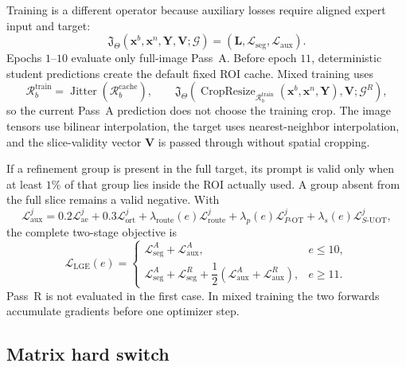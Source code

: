 \documentclass[10pt]{article}
\newcommand{\cL}{\mathcal{L}}
\newcommand{\cG}{\mathcal{G}}
\newcommand{\Crop}{\operatorname{CropResize}}
\begin{document}
Training is a different operator because auxiliary losses require aligned
expert input and target:
\[
 \mathfrak J_\Theta(\bm x^b,\bm x^n,\bm Y,\bm V;\cG)
 =(\bm L,\cL_{\mathrm{seg}},\cL_{\mathrm{aux}}).
\]
Epochs $1$--$10$ evaluate only full-image Pass~A.  Before epoch $11$,
deterministic student predictions create the default fixed ROI cache.  Mixed
training uses
\begin{equation}
 \mathcal R_b^{\mathrm{train}}
 =\operatorname{Jitter}(\mathcal R_b^{\mathrm{cache}}),
 \qquad
 \mathfrak J_\Theta\!\left(
  \Crop_{\mathcal R_b^{\mathrm{train}}}
  (\bm x^b,\bm x^n,\bm Y),\bm V;\cG^R\right),
 \label{eq:lge-cache}
\end{equation}
so the current Pass~A prediction does not choose the training crop.
The image tensors use bilinear interpolation, the target uses nearest-neighbor
interpolation, and the slice-validity vector $\bm V$ is passed through without
spatial cropping.

If a refinement group is present in the full target, its prompt is valid only
when at least $1\%$ of that group lies inside the ROI actually used.  A group
absent from the full slice remains a valid negative.  With
\[
 \cL_{\mathrm{aux}}^j
 =0.2\cL_{\mathrm{ae}}^j+0.3\cL_{\mathrm{ort}}^j
 +\lambda_{\mathrm{route}}(e)\cL_{\mathrm{route}}^j
 +\lambda_p(e)\cL_{P\text{-OT}}^j
 +\lambda_s(e)\cL_{S\text{-UOT}}^j,
\]
the complete two-stage objective is
\begin{equation}
\boxed{
 \cL_{\mathrm{LGE}}(e)=
 \begin{cases}
  \cL_{\mathrm{seg}}^A+\cL_{\mathrm{aux}}^A,
     &e\leq10,\\[1mm]
  \cL_{\mathrm{seg}}^A+\cL_{\mathrm{seg}}^R
  +\dfrac12(\cL_{\mathrm{aux}}^A+\cL_{\mathrm{aux}}^R),
     &e\geq11.
 \end{cases}}
\label{eq:lge-loss}
\end{equation}
Pass~R is not evaluated in the first case.  In mixed training the two forwards
accumulate gradients before one optimizer step.

\subsection{Matrix hard switch}
\end{document}
